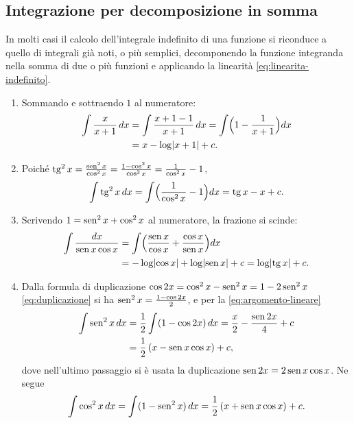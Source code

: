 \subsection{Integrazione per decomposizione in somma}

In molti casi il calcolo dell'integrale indefinito di una funzione si riconduce a quello
di integrali già noti, o più semplici, decomponendo la funzione integranda nella somma
di due o più funzioni e applicando la linearità \eqref{eq:linearita-indefinito}.

\begin{esempio}\label{es:decomposizione}
\begin{enumerate}[label=\textup{(\alph*)}]
  \item Sommando e sottraendo $1$ al numeratore:
  \[
  \begin{aligned}
    \int\frac x{x+1}\,dx&=\int\frac{x+1-1}{x+1}\,dx=\int\Bigl(1-\frac1{x+1}\Bigr)dx\\
    &=x-\log\lvert x+1\rvert+c .
  \end{aligned}
  \]
  \item Poiché $\operatorname{tg}^{2}x=\frac{\operatorname{sen}^{2}x}{\cos^{2}x}=\frac{1-\cos^{2}x}{\cos^{2}x}=\frac1{\cos^{2}x}-1$,
  \[
    \int\operatorname{tg}^{2}x\,dx=\int\Bigl(\frac1{\cos^{2}x}-1\Bigr)dx=\operatorname{tg} x-x+c .
  \]
  \item Scrivendo $1=\operatorname{sen}^{2}x+\cos^{2}x$ al numeratore, la frazione si scinde:
  \[
  \begin{aligned}
    \int\frac{dx}{\operatorname{sen} x\cos x}&=\int\Bigl(\frac{\operatorname{sen} x}{\cos x}+\frac{\cos x}{\operatorname{sen} x}\Bigr)dx\\
    &=-\log\lvert \cos x\rvert+\log\lvert \operatorname{sen} x\rvert+c=\log\lvert \operatorname{tg} x\rvert+c .
  \end{aligned}
  \]
  \item Dalla formula di duplicazione $\cos2x=\cos^{2}x-\operatorname{sen}^{2}x=1-2\operatorname{sen}^{2}x$
  \eqref{eq:duplicazione} si ha $\operatorname{sen}^{2}x=\frac{1-\cos2x}2$, e per la
  \eqref{eq:argomento-lineare}
  \begin{equation}\label{eq:integrale-sen2}
  \begin{split}
    \int\operatorname{sen}^{2}x\,dx&=\frac12\int(1-\cos2x)\,dx=\frac x2-\frac{\operatorname{sen}2x}4+c\\
    &=\frac12\,(x-\operatorname{sen} x\cos x)+c ,
  \end{split}
  \end{equation}
  dove nell'ultimo passaggio si è usata la duplicazione $\operatorname{sen}2x=2\operatorname{sen} x\cos x$. Ne segue
  \begin{equation}\label{eq:integrale-cos2}
    \int\cos^{2}x\,dx=\int(1-\operatorname{sen}^{2}x)\,dx=\frac12\,(x+\operatorname{sen} x\cos x)+c .
  \end{equation}
\end{enumerate}
\end{esempio}

